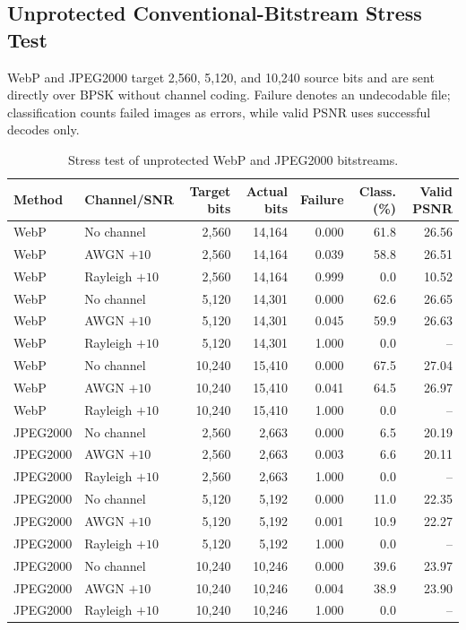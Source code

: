 \documentclass[letterpaper,journal]{IEEEtran}
\begin{document}
\subsection{Unprotected Conventional-Bitstream Stress Test}
\label{sec:unprotected}
WebP and JPEG2000 target 2,560, 5,120, and 10,240 source bits and are sent directly over BPSK without channel coding. Failure denotes an undecodable file; classification counts failed images as errors, while valid PSNR uses successful decodes only.

\begin{table}[!t]
\centering
\caption{Stress test of unprotected WebP and JPEG2000 bitstreams.}
\label{tab:unprotected}
\scriptsize
\setlength{\tabcolsep}{4pt}
\begin{tabular}{@{}llrrrrr@{}}
\toprule
Method & Channel/SNR & Target bits & Actual bits & Failure & Class. (\%) & Valid PSNR \\ \midrule
WebP & No channel & 2,560 & 14,164 & 0.000 & 61.8 & 26.56 \\
WebP & AWGN $+10$ & 2,560 & 14,164 & 0.039 & 58.8 & 26.51 \\
WebP & Rayleigh $+10$ & 2,560 & 14,164 & 0.999 & 0.0 & 10.52 \\
WebP & No channel & 5,120 & 14,301 & 0.000 & 62.6 & 26.65 \\
WebP & AWGN $+10$ & 5,120 & 14,301 & 0.045 & 59.9 & 26.63 \\
WebP & Rayleigh $+10$ & 5,120 & 14,301 & 1.000 & 0.0 & -- \\
WebP & No channel & 10,240 & 15,410 & 0.000 & 67.5 & 27.04 \\
WebP & AWGN $+10$ & 10,240 & 15,410 & 0.041 & 64.5 & 26.97 \\
WebP & Rayleigh $+10$ & 10,240 & 15,410 & 1.000 & 0.0 & -- \\ \midrule
JPEG2000 & No channel & 2,560 & 2,663 & 0.000 & 6.5 & 20.19 \\
JPEG2000 & AWGN $+10$ & 2,560 & 2,663 & 0.003 & 6.6 & 20.11 \\
JPEG2000 & Rayleigh $+10$ & 2,560 & 2,663 & 1.000 & 0.0 & -- \\
JPEG2000 & No channel & 5,120 & 5,192 & 0.000 & 11.0 & 22.35 \\
JPEG2000 & AWGN $+10$ & 5,120 & 5,192 & 0.001 & 10.9 & 22.27 \\
JPEG2000 & Rayleigh $+10$ & 5,120 & 5,192 & 1.000 & 0.0 & -- \\
JPEG2000 & No channel & 10,240 & 10,246 & 0.000 & 39.6 & 23.97 \\
JPEG2000 & AWGN $+10$ & 10,240 & 10,246 & 0.004 & 38.9 & 23.90 \\
JPEG2000 & Rayleigh $+10$ & 10,240 & 10,246 & 1.000 & 0.0 & -- \\ \bottomrule
\end{tabular}
\end{table}
\end{document}
